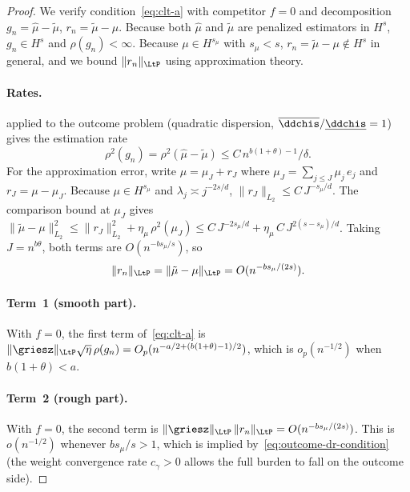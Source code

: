 \documentclass{article}
\begin{document}
\begin{proof}
We verify condition~\eqref{eq:clt-a}
with competitor $f = 0$
and decomposition
$g_n = \hat\mu - \tilde\mu$,
$r_n = \tilde\mu - \mu$.
Because both $\hat\mu$ and $\tilde\mu$
are penalized estimators in $H^s$,
$g_n \in H^s$ and $\rho(g_n) < \infty$.
Because $\mu \in H^{s_\mu}$ with $s_\mu < s$,
$r_n = \tilde\mu - \mu \notin H^s$ in general,
and we bound $\|r_n\|_{\LtP}$
using approximation theory.

\paragraph{Rates.}
applied to the outcome problem
(quadratic dispersion,
$\overline{\ddchis}/\underline{\ddchis} = 1$)
gives the estimation rate
\begin{equation}
\label{eq:outcome-seminorm-rate}
\rho^2(g_n)
  = \rho^2(\hat\mu - \tilde\mu)
  \le C\,n^{b(1+\theta)-1}/\delta.
\end{equation}
For the approximation error,
write $\mu = \mu_J + r_J$
where $\mu_J = \sum_{j \le J} \mu_j\,e_j$
and $r_J = \mu - \mu_J$.
Because $\mu \in H^{s_\mu}$
and $\lambda_j \asymp j^{-2s/d}$,
$\|r_J\|_{L_2}
  \le C\,J^{-s_\mu/d}$.
The comparison bound at $\mu_J$ gives
$\|\tilde\mu - \mu\|_{L_2}^2
  \le \|r_J\|_{L_2}^2
  + \eta_\mu\,\rho^2(\mu_J)
  \le C\,J^{-2s_\mu/d}
  + \eta_\mu\,C\,J^{2(s-s_\mu)/d}$.
Taking $J = n^{b\theta}$,
both terms are $O(n^{-bs_\mu/s})$,
so
\begin{equation}
\label{eq:approx-l2-rate}
\|r_n\|_{\LtP}
  = \|\tilde\mu - \mu\|_{\LtP}
  = O(n^{-bs_\mu/(2s)}).
\end{equation}

\paragraph{Term~1 (smooth part).}
With $f = 0$, the first term
of~\eqref{eq:clt-a} is
$\|\griesz\|_{\LtP}\sqrt{\eta}\,\rho(g_n)
  = O_p(n^{-a/2 + (b(1+\theta)-1)/2})$,
which is $o_p(n^{-1/2})$
when $b(1+\theta) < a$.

\paragraph{Term~2 (rough part).}
With $f = 0$,
the second term is
$\|\griesz\|_{\LtP}\,\|r_n\|_{\LtP}
  = O(n^{-bs_\mu/(2s)})$.
This is $o(n^{-1/2})$
whenever $bs_\mu/s > 1$,
which is implied
by~\eqref{eq:outcome-dr-condition}
(the weight convergence rate
$c_\gamma > 0$ allows the full burden
to fall on the outcome side).


\end{proof}
\end{document}
